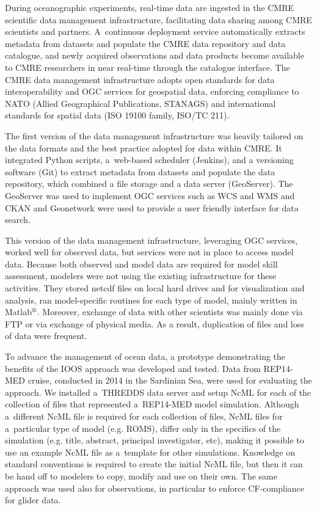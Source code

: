 \documentclass[osd, online, hvmath]{copernicus}
\begin{document}
During oceanographic experiments, real-time data are ingested in the CMRE scientific
data management infrastructure, facilitating data sharing among CMRE scientists and partners.  
A~continuous deployment service automatically extracts metadata from datasets and populate the CMRE data repository and data catalogue, and newly acquired observations and data products become available to CMRE researchers in near real-time through the catalogue interface.
The CMRE data management infrastructure adopts open standards for data interoperability and OGC services for geospatial data, enforcing compliance to NATO (Allied Geographical Publications, STANAGS) and international standards for spatial data (ISO 19100 family, ISO/TC 211). 

The first version of the data management infrastructure was heavily tailored on the data formats and the best practice adopted for data within CMRE. It integrated Python scripts, a~web-based scheduler (Jenkins), and a versioning software (Git) to extract metadata from datasets and populate the data repository, which combined a file storage and a data server (GeoServer). The GeoServer was used to implement OGC services such as WCS and WMS and CKAN and Geonetwork were used to provide a user friendly interface for data search. 

This version of the data management infrastructure, leveraging OGC services, worked well for observed data, but services were not in place to access model data.  Because both observed and model data are required for model skill assessment, modelers were not using the existing infrastructure for these activities.  They stored netcdf files on local hard drives and for visualization and analysis, ran model-specific routines for each type of model, mainly written in Matlab$^{\text{\textregistered}}$. Moreover, exchange of data with other scientists was mainly done via FTP or via exchange of physical media. As a result, duplication of files and loss of data were frequent. 

To advance the management of ocean data, a prototype demonstrating the benefits of the IOOS approach was developed and tested.  
Data from REP14-MED cruise, conducted in 2014 in the Sardinian Sea, were used for evaluating the approach. 
We installed a~THREDDS data server and setup NcML for each of the collection of files that represented a~REP14-MED model simulation. 
Although a~different NcML file is required for each collection of files, NcML files for a~particular type of model (e.g. ROMS), differ only in the specifics of the simulation (e.g. title, abstract, principal investigator, etc), making it possible to use an example NcML file as a~template for other simulations. 
Knowledge on standard conventions is required to create the initial NcML file, but then it can be hand off to modelers to copy, modify and use on their own.
The same approach was used also for observations, in particular to enforce CF-compliance for glider data. 
\end{document}
